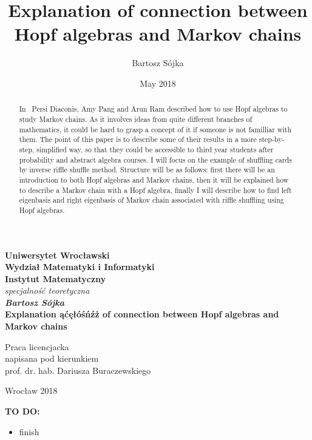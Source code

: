 \documentclass[a4paper, 12pt]{report}
\title{Explanation of connection between Hopf algebras and Markov chains}
\author{Bartosz Sójka}
\date{May 2018}
\newcommand{\todo}[1]{\hfill \break \textbf{\Huge TO DO: #1 \hfill \break}\normalsize}
\begin{document}
\thispagestyle{empty}
\begin{center}
\textbf{\large Uniwersytet Wrocławski\\
Wydział Matematyki i Informatyki\\
Instytut Matematyczny}\\
\textit{\large specjalność teoretyczna}\\
\vspace{4cm}
\textbf{\textit{\large Bartosz Sójka}\\
\vspace{0.5cm}
{\Large Explanation ąćęłóśńźż of connection between Hopf algebras and Markov chains}}\\
\end{center}
\vspace{3cm}
{\large \hspace*{6.5cm}Praca licencjacka\\
\hspace*{6.5cm}napisana pod kierunkiem\\
\hspace*{6.5cm}prof. dr. hab. Dariusza Buraczewskiego }\\
\vfill
\begin{center}
{\large Wrocław 2018}\\
\end{center}
\newpage
\null
\thispagestyle{empty}
\newpage
\tableofcontents

\begin{abstract}

In~\cite{Diaconis2014} Persi Diaconis, Amy Pang and Arun Ram described how to use Hopf algebras to
study Markov chains. As it involves ideas from quite different branches of mathematics, it could be hard to
grasp a concept of it if someone is not familliar with them.
The point of this paper is to describe some of their results in a more step-by-step, simplified way,
so that they could be accessible to third year students after probability
and abstract algebra courses. I will focus on the example of shuffling cards by inverse riffle shuffle
method. Structure will be as follows: first there will be an introduction to both Hopf algebras and Markov
chains, then it will be explained how to describe a Markov chain with a Hopf algebra, finally I will
describe how to find left eigenbasis and right eigenbasis of Markov chain associated with riffle shuffling
using Hopf algebras.


\end{abstract}
\todo{}
\begin{itemize}
\item finish
\end{itemize}
\end{document}
